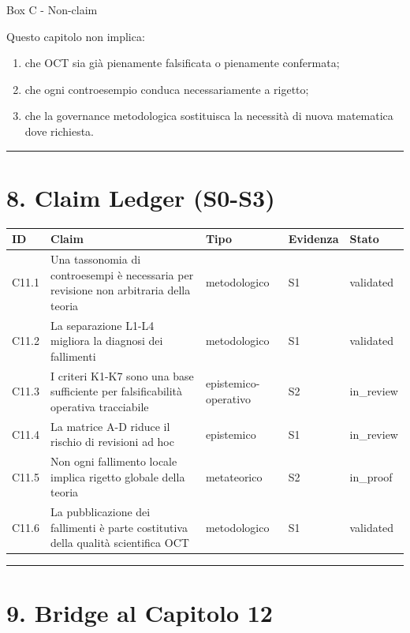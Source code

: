 Box C - Non-claim

Questo capitolo non implica:

\begin{enumerate}
\def\labelenumi{\arabic{enumi}.}
\tightlist
\item
  che OCT sia già pienamente falsificata o pienamente confermata;
\item
  che ogni controesempio conduca necessariamente a rigetto;
\item
  che la governance metodologica sostituisca la necessità di nuova matematica dove richiesta.
\end{enumerate}

\begin{center}\rule{0.5\linewidth}{0.5pt}\end{center}

\section{8. Claim Ledger (S0-S3)}

{\def\LTcaptype{none} %
\begin{longtable}[]{@{}lllll@{}}
\toprule\noalign{}
ID & Claim & Tipo & Evidenza & Stato \\
\midrule\noalign{}
\endhead
\bottomrule\noalign{}
\endlastfoot
C11.1 & Una tassonomia di controesempi è necessaria per revisione non arbitraria della teoria & metodologico & S1 & validated \\
C11.2 & La separazione L1-L4 migliora la diagnosi dei fallimenti & metodologico & S1 & validated \\
C11.3 & I criteri K1-K7 sono una base sufficiente per falsificabilità operativa tracciabile & epistemico-operativo & S2 & in\_review \\
C11.4 & La matrice A-D riduce il rischio di revisioni ad hoc & epistemico & S1 & in\_review \\
C11.5 & Non ogni fallimento locale implica rigetto globale della teoria & metateorico & S2 & in\_proof \\
C11.6 & La pubblicazione dei fallimenti è parte costitutiva della qualità scientifica OCT & metodologico & S1 & validated \\
\end{longtable}
}

\begin{center}\rule{0.5\linewidth}{0.5pt}\end{center}

\section{9. Bridge al Capitolo 12}

